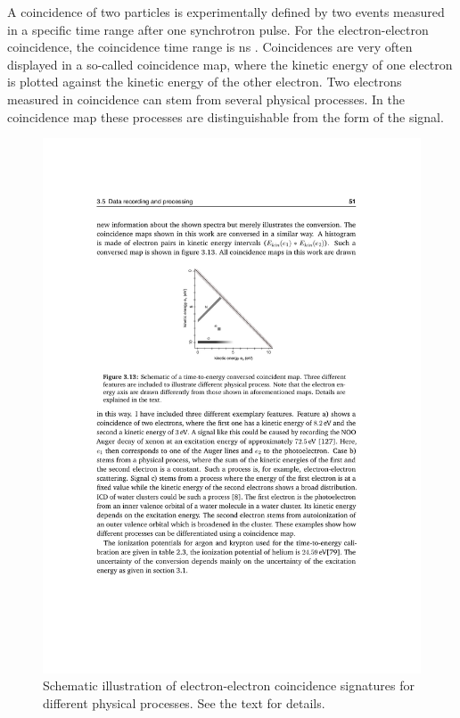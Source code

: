 A coincidence of two particles is experimentally defined by two events
measured in a specific time range after one synchrotron pulse.
For the
electron-electron coincidence, the coincidence time range is \unit[1600]{ns}
\cite{Foerstel_private}.
Coincidences are very often displayed in a so-called coincidence map,
where the kinetic energy of one electron is plotted against the
kinetic energy of the other electron. 
Two electrons measured in coincidence can stem from several physical
processes. In the coincidence map these processes are distinguishable
from the form of the signal.

\begin{figure}[h]
  \centering
  \includegraphics{pics/ee_coincidence_processes.pdf}
  \caption{Schematic illustration of electron-electron
           coincidence signatures for different physical processes.
           \cite{PhDFoerstel} See the text for details.}
  \label{figure:ee_coincidence_processes}
\end{figure}

